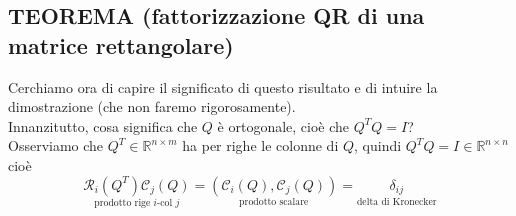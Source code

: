 \subsection{TEOREMA (fattorizzazione QR di una matrice rettangolare)}
\begin{center}
\end{center}
Cerchiamo ora di capire il significato di questo risultato e di intuire la dimostrazione (che non faremo rigorosamente). \\
Innanzitutto, cosa significa che $Q$ è ortogonale, cioè che $Q^TQ=I$?\\
Osserviamo che $Q^T\in \mathbb{R}^{n\times m}$ ha per righe le colonne di $Q$, quindi $Q^TQ=I\in \mathbb{R}^{n\times n}$ cioè
\begin{equation*}
    \underset{\text{prodotto rige $i$-col $j$}}{\mathcal{R}_i(Q^T)\mathcal{C}_j(Q)}=\underset{\text{prodotto scalare}}{(\mathcal{C}_i(Q),\mathcal{C}_j(Q))}=\underset{\text{delta di Kronecker}}{\delta_{ij}}
\end{equation*}
